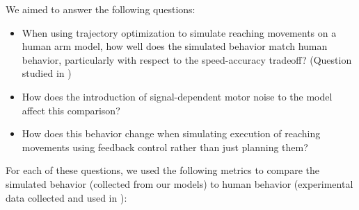 \documentclass[letterpaper, 10pt, conference]{ieeeconf}
\begin{document}
We aimed to answer the following questions: 
\begin{itemize}
    \item When using trajectory optimization to simulate reaching movements on a human arm model, how well does the simulated behavior match human behavior, particularly with respect to the speed-accuracy tradeoff? (Question studied in \cite{original_paper_high_fidelity})

    \item How does the introduction of signal-dependent motor noise to the model affect this comparison?

    \item How does this behavior change when simulating execution of reaching movements using feedback control rather than just planning them?
\end{itemize}
For each of these questions, we used the following metrics to compare the simulated behavior (collected from our models) to human behavior (experimental data collected and used in \cite{original_paper_high_fidelity}):
\end{document}
